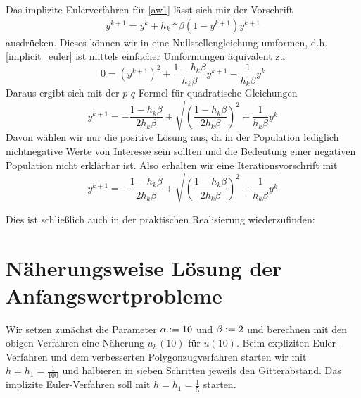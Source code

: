 \documentclass[ %
ngerman, %
a4paper, %
12pt, %
sectionreset, %
chapterstyle=framed, %
sectionstyle=dotted, %
titlefont=osfamily %
]{../../../../texmf/tex/latex/mathscriptMathTUD/mathscriptMathTUD}
\begin{document}
   	Das implizite Eulerverfahren für \eqref{aw1} lässt sich mir der Vorschrift
   	\begin{align}
   		y^{k+1} = y^k + h_k * \beta (1-y^{k+1}) y^{k+1} \label{implicit_euler}
   	\end{align}
   	ausdrücken. Dieses können wir in eine Nullstellengleichung umformen, d.h. \eqref{implicit_euler} ist mittels einfacher Umformungen äquivalent zu
   	\begin{equation*}
   		0 = \left(y^{k+1}\right)^2 + \frac{1 - h_k \beta }{h_k \beta} y^{k+1} - \frac{1}{h_k \beta} y^k
   	\end{equation*}
    Daraus ergibt sich mit der $p$-$q$-Formel für quadratische Gleichungen
    \begin{equation*}
    	y^{k+1} = - \frac{1 - h_k \beta}{2 h_k \beta} \pm \sqrt{\left(\frac{1 - h_k \beta}{2 h_k \beta}\right)^2 + \frac{1}{h_k \beta} y^k}
    \end{equation*}
    Davon wählen wir nur die positive Lösung aus, da in der Population lediglich nichtnegative Werte von Interesse sein sollten und die Bedeutung einer negativen Population nicht erklärbar ist. Also erhalten wir eine Iterationsvorschrift mit
    \begin{equation*}
    	y^{k+1} = - \frac{1 - h_k \beta}{2 h_k \beta} + \sqrt{\left(\frac{1 - h_k \beta}{2 h_k \beta}\right)^2 + \frac{1}{h_k \beta} y^k}
    \end{equation*}
    
    \pagebreak 
    
    Dies ist schließlich auch in der praktischen Realisierung wiederzufinden:
    
    
    \section{Näherungsweise Lösung der Anfangswertprobleme}
    
    Wir setzen zunächst die Parameter $\alpha \mathrel{:=} 10$ und $\beta \mathrel{:=} 2$ und berechnen mit den obigen Verfahren eine Näherung $u_h(10)$ für $u(10)$.
    Beim expliziten Euler-Verfahren und dem verbesserten Polygonzugverfahren starten wir mit $h = h_1 = \frac{1}{100}$ und halbieren in sieben Schritten jeweils den Gitterabstand. Das implizite Euler-Verfahren soll mit $h = h_1 = \frac{1}{5}$ starten.
    
\end{document}
